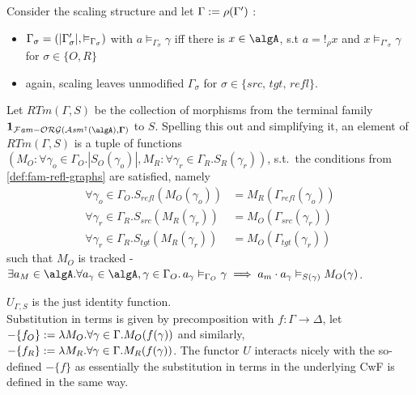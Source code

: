 \documentclass[12pt,a4paper]{article}
\def\cAsm{\mathcal{A}\mathit{sm}^\dagger(\algA)}
\def\cFamORG{\mathcal{F}\mathit{am-}\mathcal{ORG}}
\def\src{_{src}}
\def\rfl{_{refl}}
\def\tgt{_{tgt}}
\renewcommand{\O}{_{O}}\alwaysmath{O}
\newcommand{\R}{\ensuremath{_{R}}}
\begin{document}
Consider the scaling structure and let $\Gamma := \rho(\Gamma')$ :
  \begin{itemize}
    \item $\Gamma_\sigma = (|\Gamma'_\sigma|, \vDash_{\Gamma_\sigma})$ with $a \vDash_{\Gamma_\sigma} \gamma$ iff there is $x \in \algA$, s.t $a = !_\rho x$ and $x \vDash_{\Gamma'_\sigma} \gamma$ for $\sigma \in \{O, R\}$
    
    \item again, scaling leaves unmodified $\Gamma_\sigma$ for $\sigma\in  \{src,\, tgt,\, refl \}$.
\end{itemize}

Let $RTm(\Gamma, S)$ be the collection of morphisms from the terminal family $\terminal{\cFamORG(\cAsm, \Gamma)}$ to $S$. Spelling this out and simplifying it, an element of $RTm(\Gamma, S)$ is a tuple of functions $(M\O: \forall \gamma_o \in \Gamma\O. |S\O(\gamma_o)|, M\R : \forall \gamma_r \in \Gamma\R. S\R(\gamma_r))$, s.t.\ the conditions from \cref{def:fam-refl-graphs} are satisfied, namely 
\begin{align*}
\forall \gamma_o \in \Gamma\O. {S\rfl} (M\O(\gamma_o)) &= M\R(\Gamma\rfl(\gamma_o))\\
\forall \gamma_r \in \Gamma\R. {S\src} (M\R(\gamma_r)) &= M\O(\Gamma\src(\gamma_r))\\
\forall \gamma_r \in \Gamma\R. {S\tgt} (M\R(\gamma_r)) &= M\O(\Gamma\tgt(\gamma_r))
\end{align*}
such that $M\O$ is tracked - $\exists a_M \in \algA. \forall a_\gamma \in \algA, \gamma \in \Gamma\O.\, a_\gamma \vDash_{\Gamma_O} \gamma \implies a_m \cdot a_\gamma \vDash_{S(\gamma)} M\O(\gamma)$.

$U_{\Gamma,S}$ is the just identity function.\\
Substitution in terms is given by precomposition with $f : \Gamma \to \Delta$, let $-\{f\O\} \define \lambda M\O. \forall \gamma \in \Gamma . M\O(f(\gamma))$ and similarly, $-\{f\R\} \define \lambda M\R . \forall \gamma \in \Gamma . M\R(f(\gamma))$. The functor $U$ interacts nicely with the so-defined $-\{f\}$ as essentially the substitution in terms in the underlying CwF is defined in the same way.\\
\end{document}
